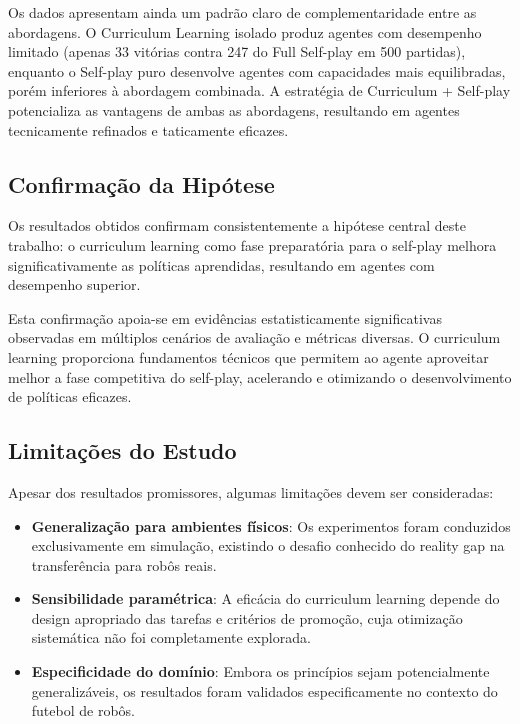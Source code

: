 Os dados apresentam ainda um padrão claro de complementaridade entre as abordagens. O Curriculum Learning isolado produz agentes com desempenho limitado (apenas 33 vitórias contra 247 do Full Self-play em 500 partidas), enquanto o Self-play puro desenvolve agentes com capacidades mais equilibradas, porém inferiores à abordagem combinada. A estratégia de Curriculum + Self-play potencializa as vantagens de ambas as abordagens, resultando em agentes tecnicamente refinados e taticamente eficazes.

\subsection{Confirmação da Hipótese}

Os resultados obtidos confirmam consistentemente a hipótese central deste trabalho: o curriculum learning como fase preparatória para o self-play melhora significativamente as políticas aprendidas, resultando em agentes com desempenho superior.

Esta confirmação apoia-se em evidências estatisticamente significativas observadas em múltiplos cenários de avaliação e métricas diversas. O curriculum learning proporciona fundamentos técnicos que permitem ao agente aproveitar melhor a fase competitiva do self-play, acelerando e otimizando o desenvolvimento de políticas eficazes.

\subsection{Limitações do Estudo}

Apesar dos resultados promissores, algumas limitações devem ser consideradas:

\begin{itemize}
    \item \textbf{Generalização para ambientes físicos}: Os experimentos foram conduzidos exclusivamente em simulação, existindo o desafio conhecido do reality gap na transferência para robôs reais.
    
    \item \textbf{Sensibilidade paramétrica}: A eficácia do curriculum learning depende do design apropriado das tarefas e critérios de promoção, cuja otimização sistemática não foi completamente explorada.
    
    \item \textbf{Especificidade do domínio}: Embora os princípios sejam potencialmente generalizáveis, os resultados foram validados especificamente no contexto do futebol de robôs.
\end{itemize}

